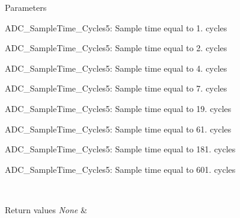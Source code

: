 \begin{DoxyParams}{Parameters}
\begin{DoxyItemize}
\item A\-D\-C\-\_\-\-Sample\-Time\-\_\-Cycles5\-: Sample time equal to 1. cycles \item A\-D\-C\-\_\-\-Sample\-Time\-\_\-Cycles5\-: Sample time equal to 2. cycles \item A\-D\-C\-\_\-\-Sample\-Time\-\_\-Cycles5\-: Sample time equal to 4. cycles \item A\-D\-C\-\_\-\-Sample\-Time\-\_\-Cycles5\-: Sample time equal to 7. cycles \item A\-D\-C\-\_\-\-Sample\-Time\-\_\-Cycles5\-: Sample time equal to 19. cycles \item A\-D\-C\-\_\-\-Sample\-Time\-\_\-Cycles5\-: Sample time equal to 61. cycles \item A\-D\-C\-\_\-\-Sample\-Time\-\_\-Cycles5\-: Sample time equal to 181. cycles \item A\-D\-C\-\_\-\-Sample\-Time\-\_\-Cycles5\-: Sample time equal to 601. cycles \end{DoxyItemize}
\\
\hline
\end{DoxyParams}

\begin{DoxyRetVals}{Return values}
{\em None} & \\
\hline
\end{DoxyRetVals}

